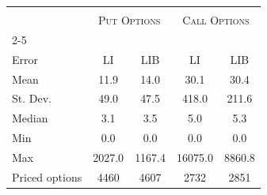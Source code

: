 \begin{center} 
 \begin{tabular*}{\textwidth}{@{\extracolsep{\fill}}lcccc} 
 \toprule 
 \multicolumn{5}{c}{}\\ 
&\multicolumn{2}{c}{\textsc{Put Options}} & \multicolumn{2}{c}{\textsc{Call Options}}\\ 
 \cline{2-5} 
 \multicolumn{5}{c}{}\\ 
Error & LI & LIB& LI & LIB\\ 
 \midrule 
Mean          & 11.9& 14.0& 30.1& 30.4\\ 
St. Dev.      & 49.0& 47.5& 418.0& 211.6\\ 
Median        & 3.1& 3.5& 5.0& 5.3\\ 
Min           & 0.0& 0.0& 0.0& 0.0\\ 
Max           & 2027.0& 1167.4& 16075.0& 8860.8\\ 
Priced options& 4460& 4607& 2732& 2851\\ 
\bottomrule 
\end{tabular*} 
\end{center}
